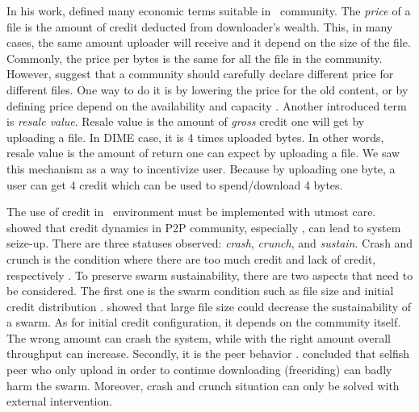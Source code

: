 In his work, \citeauthor{2012:economicbt:kash} defined many economic terms suitable in \bt~community. The \textit{price} of a file is the amount of credit deducted from downloader's wealth. This, in many cases, the same amount uploader will receive and it depend on the size of the file. Commonly, the price per bytes is the same for all the file in the community. However, \citeauthor{2012:economicbt:kash} suggest that a community should carefully declare different price for different files. One way to do it is by lowering the price for the old content, or by defining price depend on the availability and capacity \cite{2012:economicbt:kash}. Another introduced term is \textit{resale value}. Resale value is the amount of \textit{gross} credit one will get by uploading a file. In DIME case, it is 4 times uploaded bytes. In other words, resale value is the amount of return one can expect by uploading a file. We saw this mechanism as a way to incentivize user. Because by uploading one byte, a user can get 4 credit which can be used to spend/download 4 bytes.



The use of credit in \bt~environment must be implemented with utmost care. \citeauthor{2010:crashsustain:rahman} showed that credit dynamics in P2P community, especially \bt, can lead to system seize-up. There are three statuses observed: \textit{crash}, \textit{crunch}, and \textit{sustain}. Crash and crunch is the condition where there are too much credit and lack of credit, respectively \cite{2010:crashsustain:rahman, 2015:sustainabilitypt:vinko}. To preserve swarm sustainability, there are two aspects that need to be considered. The first one is the swarm condition such as file size and initial credit distribution \cite{2015:sustainabilitypt:vinko}. \citeauthor{2015:sustainabilitypt:vinko} showed that large file size could decrease the sustainability of a swarm. As for initial credit configuration, it depends on the community itself. The wrong amount can crash the system, while with the right amount overall throughput can increase. Secondly, it is the peer behavior \cite{2010:crashsustain:rahman}. \citeauthor{2010:crashsustain:rahman} concluded that selfish peer who only upload in order to continue downloading (freeriding) can badly harm the swarm. Moreover, crash and crunch situation can only be solved with external intervention.

